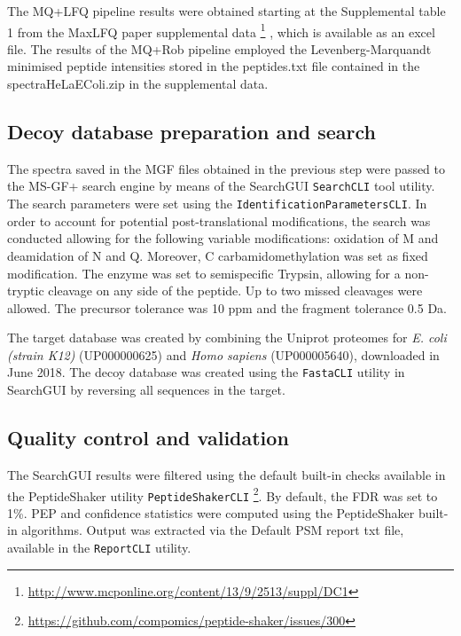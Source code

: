 The MQ+LFQ pipeline results were obtained starting at the Supplemental table 1 from the MaxLFQ paper supplemental data \footnote{\href{http://www.mcponline.org/content/13/9/2513/suppl/DC1}{http://www.mcponline.org/content/13/9/2513/suppl/DC1}} \cite{Cox2014}, which is available as an excel file. The results of the MQ+Rob pipeline employed the Levenberg-Marquandt minimised peptide intensities stored in the peptides.txt file contained in the spectraHeLaEColi.zip in the supplemental data.


\subsection{Decoy database preparation and search}
\label{subsec:database_preparation}

The spectra saved in the MGF files obtained in the previous step were passed to the MS-GF+ search engine \cite{Kim2014} by means of the SearchGUI \texttt{SearchCLI} tool \cite{Barsnes2018} utility. The search parameters were set using the \texttt{IdentificationParametersCLI}. In order to account for potential post-translational modifications, the search was conducted allowing for the following variable modifications: oxidation of M and deamidation of N and Q. Moreover, C carbamidomethylation was set as fixed modification. The enzyme was set to semispecific Trypsin, allowing for a non-tryptic cleavage on any side of the peptide. Up to two missed cleavages were allowed. The precursor tolerance was 10 ppm and the fragment tolerance 0.5 Da. 


The target database was created by combining the Uniprot proteomes for \textit{E. coli (strain K12)} (UP000000625) and \textit{Homo sapiens} (UP000005640), downloaded in June 2018. The decoy database was created using the \texttt{FastaCLI} utility in SearchGUI by reversing all sequences in the target.

\subsection{Quality control and validation}

The SearchGUI results were filtered using the default built-in checks available in the PeptideShaker utility \texttt{PeptideShakerCLI} \cite{Vaudel2015} \footnote{\href{https://github.com/compomics/peptide-shaker/issues/300}{https://github.com/compomics/peptide-shaker/issues/300}}. By default, the FDR was set to 1\%. PEP and confidence statistics were computed using the PeptideShaker built-in algorithms. Output was extracted via the Default PSM report txt file, available in the \texttt{ReportCLI} utility.


